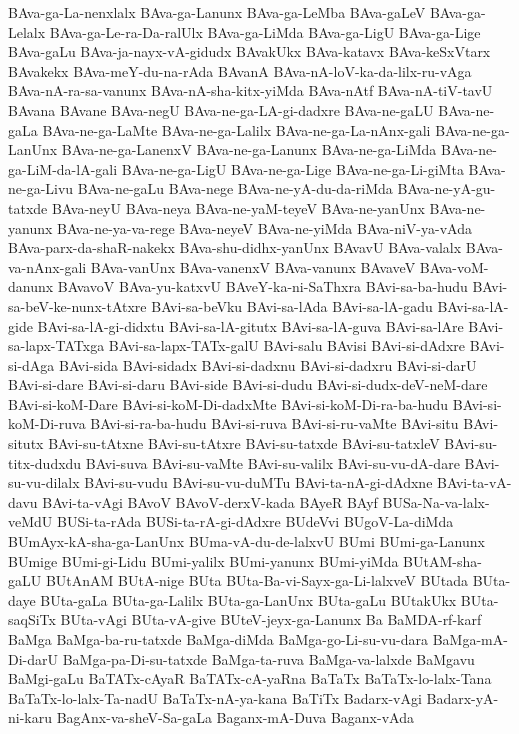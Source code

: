 {BAva-ga-La-nenxlalx
BAva-ga-Lanunx
BAva-ga-LeMba
BAva-gaLeV
BAva-ga-Lelalx
BAva-ga-Le-ra-Da-ralUlx
BAva-ga-LiMda
BAva-ga-LigU
BAva-ga-Lige
BAva-gaLu
BAva-ja-nayx-vA-gidudx
BAvakUkx
BAva-katavx
BAva-keSxVtarx
BAvakekx
BAva-meY-du-na-rAda
BAvanA
BAva-nA-loV-ka-da-lilx-ru-vAga
BAva-nA-ra-sa-vanunx
BAva-nA-sha-kitx-yiMda
BAva-nAtf
BAva-nA-tiV-tavU
BAvana
BAvane
BAva-negU
BAva-ne-ga-LA-gi-dadxre
BAva-ne-gaLU
BAva-ne-gaLa
BAva-ne-ga-LaMte
BAva-ne-ga-Lalilx
BAva-ne-ga-La-nAnx-gali
BAva-ne-ga-LanUnx
BAva-ne-ga-LanenxV
BAva-ne-ga-Lanunx
BAva-ne-ga-LiMda
BAva-ne-ga-LiM-da-lA-gali
BAva-ne-ga-LigU
BAva-ne-ga-Lige
BAva-ne-ga-Li-giMta
BAva-ne-ga-Livu
BAva-ne-gaLu
BAva-nege
BAva-ne-yA-du-da-riMda
BAva-ne-yA-gu-tatxde
BAva-neyU
BAva-neya
BAva-ne-yaM-teyeV
BAva-ne-yanUnx
BAva-ne-yanunx
BAva-ne-ya-va-rege
BAva-neyeV
BAva-ne-yiMda
BAva-niV-ya-vAda
BAva-parx-da-shaR-nakekx
BAva-shu-didhx-yanUnx
BAvavU
BAva-valalx
BAva-va-nAnx-gali
BAva-vanUnx
BAva-vanenxV
BAva-vanunx
BAvaveV
BAva-voM-danunx
BAvavoV
BAva-yu-katxvU
BAveY-ka-ni-SaThxra
BAvi-sa-ba-hudu
BAvi-sa-beV-ke-nunx-tAtxre
BAvi-sa-beVku
BAvi-sa-lAda
BAvi-sa-lA-gadu
BAvi-sa-lA-gide
BAvi-sa-lA-gi-didxtu
BAvi-sa-lA-gitutx
BAvi-sa-lA-guva
BAvi-sa-lAre
BAvi-sa-lapx-TATxga
BAvi-sa-lapx-TATx-galU
BAvi-salu
BAvisi
BAvi-si-dAdxre
BAvi-si-dAga
BAvi-sida
BAvi-sidadx
BAvi-si-dadxnu
BAvi-si-dadxru
BAvi-si-darU
BAvi-si-dare
BAvi-si-daru
BAvi-side
BAvi-si-dudu
BAvi-si-dudx-deV-neM-dare
BAvi-si-koM-Dare
BAvi-si-koM-Di-dadxMte
BAvi-si-koM-Di-ra-ba-hudu
BAvi-si-koM-Di-ruva
BAvi-si-ra-ba-hudu
BAvi-si-ruva
BAvi-si-ru-vaMte
BAvi-situ
BAvi-situtx
BAvi-su-tAtxne
BAvi-su-tAtxre
BAvi-su-tatxde
BAvi-su-tatxleV
BAvi-su-titx-dudxdu
BAvi-suva
BAvi-su-vaMte
BAvi-su-valilx
BAvi-su-vu-dA-dare
BAvi-su-vu-dilalx
BAvi-su-vudu
BAvi-su-vu-duMTu
BAvi-ta-nA-gi-dAdxne
BAvi-ta-vA-davu
BAvi-ta-vAgi
BAvoV
BAvoV-derxV-kada
BAyeR
BAyf
BUSa-Na-va-lalx-veMdU
BUSi-ta-rAda
BUSi-ta-rA-gi-dAdxre
BUdeVvi
BUgoV-La-diMda
BUmAyx-kA-sha-ga-LanUnx
BUma-vA-du-de-lalxvU
BUmi
BUmi-ga-Lanunx
BUmige
BUmi-gi-Lidu
BUmi-yalilx
BUmi-yanunx
BUmi-yiMda
BUtAM-sha-gaLU
BUtAnAM
BUtA-nige
BUta
BUta-Ba-vi-Sayx-ga-Li-lalxveV
BUtada
BUta-daye
BUta-gaLa
BUta-ga-Lalilx
BUta-ga-LanUnx
BUta-gaLu
BUtakUkx
BUta-saqSiTx
BUta-vAgi
BUta-vA-give
BUteV-jeyx-ga-Lanunx
Ba
BaMDA-rf-karf
BaMga
BaMga-ba-ru-tatxde
BaMga-diMda
BaMga-go-Li-su-vu-dara
BaMga-mA-Di-darU
BaMga-pa-Di-su-tatxde
BaMga-ta-ruva
BaMga-va-lalxde
BaMgavu
BaMgi-gaLu
BaTATx-cAyaR
BaTATx-cA-yaRna
BaTaTx
BaTaTx-lo-lalx-Tana
BaTaTx-lo-lalx-Ta-nadU
BaTaTx-nA-ya-kana
BaTiTx
Badarx-vAgi
Badarx-yA-ni-karu
BagAnx-va-sheV-Sa-gaLa
Baganx-mA-Duva
Baganx-vAda
}
